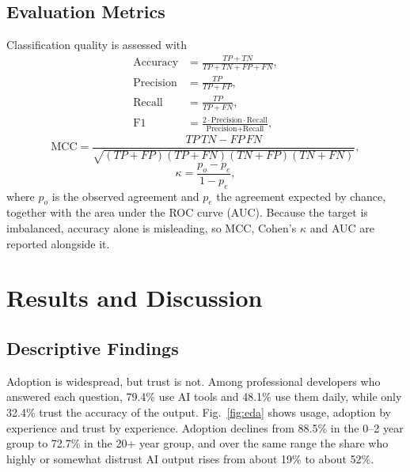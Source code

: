 \documentclass[conference]{IEEEtran}
\begin{document}
\subsection{Evaluation Metrics}
Classification quality is assessed with
\begin{align}
\text{Accuracy}&=\frac{TP+TN}{TP+TN+FP+FN},\\
\text{Precision}&=\frac{TP}{TP+FP},\\
\text{Recall}&=\frac{TP}{TP+FN},\\
\text{F1}&=\frac{2\cdot\text{Precision}\cdot\text{Recall}}{\text{Precision}+\text{Recall}},
\end{align}
\begin{equation}
\text{MCC}=\frac{TP\,TN-FP\,FN}{\sqrt{(TP{+}FP)(TP{+}FN)(TN{+}FP)(TN{+}FN)}},
\end{equation}
\begin{equation}
\kappa=\frac{p_o-p_e}{1-p_e},
\end{equation}
where $p_o$ is the observed agreement and $p_e$ the agreement expected by chance, together with the area under the ROC curve (AUC). Because the target is imbalanced, accuracy alone is misleading, so MCC, Cohen's $\kappa$ and AUC are reported alongside it.

\section{Results and Discussion}

\subsection{Descriptive Findings}
Adoption is widespread, but trust is not. Among professional developers who answered each question, 79.4\% use AI tools and 48.1\% use them daily, while only 32.4\% trust the accuracy of the output. Fig.~\ref{fig:eda} shows usage, adoption by experience and trust by experience. Adoption declines from 88.5\% in the 0--2 year group to 72.7\% in the 20+ year group, and over the same range the share who highly or somewhat distrust AI output rises from about 19\% to about 52\%.
\end{document}
